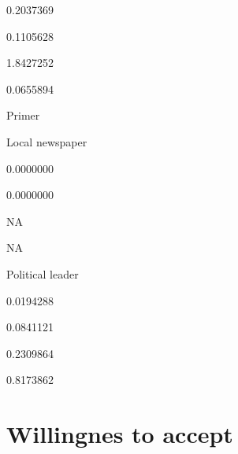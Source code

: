 \documentclass[]{book}
\begin{document}
0.2037369

0.1105628

1.8427252

0.0655894

Primer

Local newspaper

0.0000000

0.0000000

NA

NA

Political leader

0.0194288

0.0841121

0.2309864

0.8173862

\section{Willingnes to accept}\label{willingnes-to-accept-3}
\end{document}
